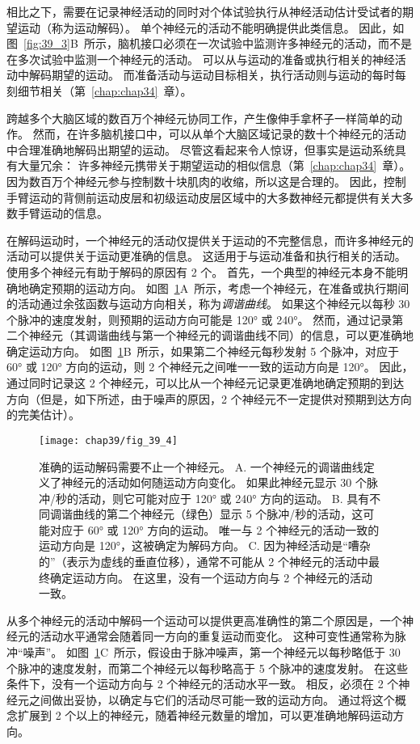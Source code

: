 相比之下，需要在记录神经活动的同时对个体试验执行从神经活动估计受试者的期望运动（称为运动解码）。
单个神经元的活动不能明确提供此类信息。
因此，如图~\ref{fig:39_3}B~所示，脑机接口必须在一次试验中监测许多神经元的活动，而不是在多次试验中监测一个神经元的活动。
可以从与运动的准备或执行相关的神经活动中解码期望的运动。
而准备活动与运动目标相关，执行活动则与运动的每时每刻细节相关（第~\ref{chap:chap34}~章）。


跨越多个大脑区域的数百万个神经元协同工作，产生像伸手拿杯子一样简单的动作。
然而，在许多脑机接口中，可以从单个大脑区域记录的数十个神经元的活动中合理准确地解码出期望的运动。
尽管这看起来令人惊讶，但事实是运动系统具有大量冗余：
许多神经元携带关于期望运动的相似信息（第~\ref{chap:chap34}~章）。
因为数百万个神经元参与控制数十块肌肉的收缩，所以这是合理的。
因此，控制手臂运动的背侧前运动皮层和初级运动皮层区域中的大多数神经元都提供有关大多数手臂运动的信息。


在解码运动时，一个神经元的活动仅提供关于运动的不完整信息，而许多神经元的活动可以提供关于运动更准确的信息。
这适用于与运动准备和执行相关的活动。
使用多个神经元有助于解码的原因有 2 个。
首先，一个典型的神经元本身不能明确地确定预期的运动方向。
如图~\ref{fig:39_4}A~所示，考虑一个神经元，在准备或执行期间的活动通过余弦函数与运动方向相关，称为\textit{调谐曲线}。
如果这个神经元以每秒 30 个脉冲的速度发射，则预期的运动方向可能是 120° 或 240°。
然而，通过记录第二个神经元（其调谐曲线与第一个神经元的调谐曲线不同）的信息，可以更准确地确定运动方向。
如图~\ref{fig:39_4}B~所示，如果第二个神经元每秒发射 5 个脉冲，对应于 60° 或 120° 方向的运动，则 2 个神经元之间唯一一致的运动方向是 120°。
因此，通过同时记录这 2 个神经元，可以比从一个神经元记录更准确地确定预期的到达方向（但是，如下所述，由于噪声的原因，2 个神经元不一定提供对预期到达方向的完美估计）。


\begin{figure}[htbp]
	\centering
	\texttt{[image: chap39/fig\_39\_4]}
	\caption{准确的运动解码需要不止一个神经元。
		A. 一个神经元的调谐曲线定义了神经元的活动如何随运动方向变化。
		如果此神经元显示 30 个脉冲/秒的活动，则它可能对应于 120° 或 240° 方向的运动。 
		B. 具有不同调谐曲线的第二个神经元（绿色）显示 5 个脉冲/秒的活动，这可能对应于 60° 或 120° 方向的运动。
		唯一与 2 个神经元的活动一致的运动方向是 120°，这被确定为解码方向。
		C. 因为神经活动是“嘈杂的”（表示为虚线的垂直位移），通常不可能从 2 个神经元的活动中最终确定运动方向。
		在这里，没有一个运动方向与 2 个神经元的活动一致。}
	\label{fig:39_4}
\end{figure}


从多个神经元的活动中解码一个运动可以提供更高准确性的第二个原因是，一个神经元的活动水平通常会随着同一方向的重复运动而变化。
这种可变性通常称为脉冲“噪声”。
如图~\ref{fig:39_4}C~所示，假设由于脉冲噪声，第一个神经元以每秒略低于 30 个脉冲的速度发射，而第二个神经元以每秒略高于 5 个脉冲的速度发射。
在这些条件下，没有一个运动方向与 2 个神经元的活动水平一致。
相反，必须在 2 个神经元之间做出妥协，以确定与它们的活动尽可能一致的运动方向。
通过将这个概念扩展到 2 个以上的神经元，随着神经元数量的增加，可以更准确地解码运动方向。




